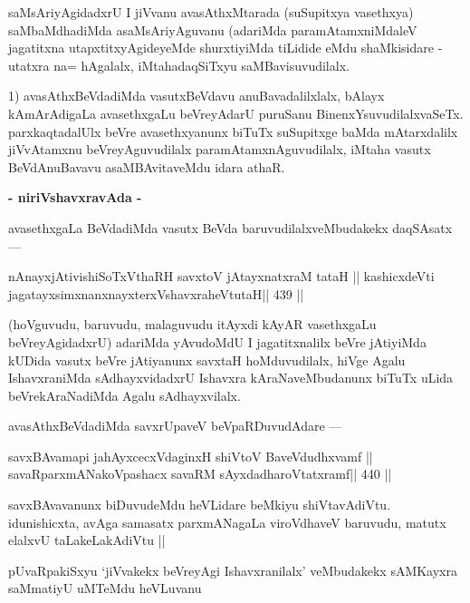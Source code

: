 \begin{artha}
saMsAriyAgidadxrU I jiVvanu avasAthxMtarada (suSupitxya vasethxya)
saMbaMdhadiMda asaMsAriyAguvanu (adariMda paramAtamxniMdaleV
jagatitxna utapxtitxyAgideyeMde shurxtiyiMda tiLidide eMdu
shaMkisidare - utatxra na= hAgalalx, iMtahadaqSiTxyu saMBavisuvudilalx.
\end{artha}

\begin{artha}
1) avasAthxBeVdadiMda vasutxBeVdavu anuBavadalilxlalx, bAlayx
kAmArAdigaLa avasethxgaLu beVreyAdarU puruSanu
BinenxYsuvudilalxvaSeTx. parxkaqtadalUlx beVre avasethxyanunx biTuTx
suSupitxge baMda mAtarxdalilx jiVvAtamxnu beVreyAguvudilalx
paramAtamxnAguvudilalx, iMtaha vasutx BeVdAnuBavavu asaMBAvitaveMdu
idara athaR.

\medskip
\centerline{\textbf{- niriVshavxravAda -}}

avasethxgaLa BeVdadiMda vasutx BeVda baruvudilalxveMbudakekx daqSAsatx ---
\end{artha}

\begin{shl}
nAnayxjAtivishiSoTxV\s thaRH savxtoV jAtayxnatxraM tataH ||
kashicxdeVti jagatayxsimxnanxnayxterxVshavxraheVtutaH\hfill || 439 ||
\end{shl}

\begin{artha}
(hoVguvudu, baruvudu, malaguvudu itAyxdi kAyAR vasethxgaLu
  beVreyAgidadxrU) adariMda yAvudoMdU I jagatitxnalilx beVre jAtiyiMda
  kUDida vasutx beVre jAtiyanunx savxtaH hoMduvudilalx, hiVge Agalu
  IshavxraniMda sAdhayxvidadxrU Ishavxra kAraNaveMbudanunx biTuTx
  uLida beVrekAraNadiMda Agalu sAdhayxvilalx.
\end{artha}

\begin{artha}
avasAthxBeVdadiMda savxrUpaveV beVpaRDuvudAdare ---
\end{artha}

\begin{shl}
savxBAvamapi jahAyxcecxVdaginxH shiVtoV BaveVdudhxvamf ||
savaRparxmANakoVpashacx savaRM sAyxdadharoVtatxramf\hfill || 440 ||
\end{shl}

\begin{artha}
savxBAvavanunx biDuvudeMdu heVLidare beMkiyu
shiVtavAdiVtu. idunishicxta, avAga samasatx parxmANagaLa viroVdhaveV
baruvudu, matutx elalxvU taLakeLakAdiVtu ||
\end{artha}

\begin{artha}
pUvaRpakiSxyu `jiVvakekx beVreyAgi Ishavxranilalx' veMbudakekx
sAMKayxra saMmatiyU uMTeMdu heVLuvanu
\end{artha}

